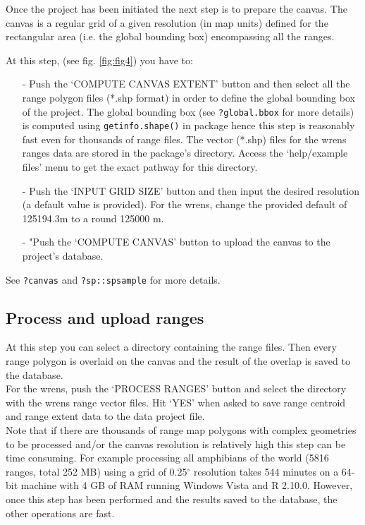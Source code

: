 \documentclass[ a4paper ]{article}
\begin{document}
	Once the project has been initiated the next step is to prepare the canvas. 
	The canvas is a regular grid of a given resolution (in map units) defined
		for the rectangular area (i.e. the global bounding box) encompassing all the ranges. 
	
	At this step, (see fig. \ref{fig:fig4}) you have to:
	\begin{enumerate}
		 \item[-] Push the `COMPUTE CANVAS EXTENT' button and then select all the range polygon files (*.shp format) in order to define the global bounding box of the project. The global bounding box (see \texttt{?global.bbox} for more details) is computed using \texttt{getinfo.shape()} in \cite{maptools} package hence this step is reasonably fast even for thousands of range files. The vector (*.shp) files for the wrens ranges data are stored in the package's directory.  Access the `help/example files' menu to get the exact pathway for this directory.
		 \item[-] Push the `INPUT GRID SIZE' button and then input the desired resolution (a default value is provided). For the wrens, change the provided default of 125194.3m to a round 125000 m.
		 \item[-] "Push the `COMPUTE CANVAS' button to upload the canvas to the project's database.
	\end{enumerate}
	
	See \texttt{?canvas}  and \texttt{?sp::spsample} for more details.


	\subsection{Process and upload ranges}

	At this step you can select a directory containing the range files. Then every range polygon is overlaid on the canvas and the result of the overlap is saved to the database.\\
For the wrens, push the `PROCESS RANGES' button and select the directory with the wrens range vector files. Hit `YES' when asked to save range centroid and range extent data to the data project file.\\
Note that if there are thousands of range map polygons with complex geometries to be processed and/or the canvas resolution is relatively high this step can be time consuming. For example processing all amphibians of the world \cite{iucn09} (5816 ranges, total 252 MB) using a grid of 0.25$^{\circ}$ resolution takes 544 minutes on a 64-bit machine with 4 GB of RAM running Windows Vista and R 2.10.0. However, once this step has been performed and the results saved to the database, the other operations are fast.
	
\end{document}
